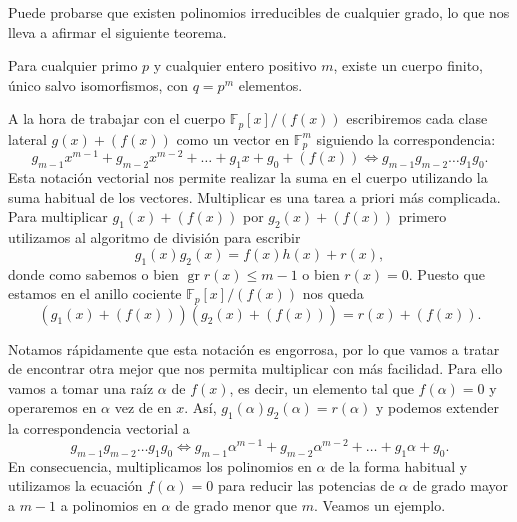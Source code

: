 Puede probarse que existen polinomios irreducibles de cualquier grado, lo que nos lleva a afirmar el siguiente teorema.

\begin{theorem}
  Para cualquier primo \(p\) y cualquier entero positivo \(m\), existe un cuerpo finito, único salvo isomorfismos, con \(q = p^m\) elementos.
\end{theorem}

A la hora de trabajar con el cuerpo \(\mathbb F_p[x]/(f(x))\) escribiremos cada clase lateral \(g(x) + (f(x))\) como un vector en \(\mathbb F_p^m\) siguiendo la correspondencia:
\[
  g_{m-1}x^{m-1} + g_{m-2}x^{m-2}+ \dots + g_1x + g_0 + (f(x)) \iff g_{m-1}g_{m-2}\dots g_1g_0.
\]
Esta notación vectorial nos permite realizar la suma en el cuerpo utilizando la suma habitual de los vectores.
Multiplicar es una tarea a priori más complicada.
Para multiplicar \(g_1(x) + (f(x))\) por \(g_2(x) + (f(x))\) primero utilizamos al algoritmo de división para escribir
\[
  g_1(x)g_2(x) = f(x)h(x) + r(x),
\]
donde como sabemos o bien \(\operatorname{gr} r(x) \leq m -1\) o bien \(r(x) = 0\).
Puesto que estamos en el anillo cociente \(\mathbb F_p[x]/(f(x))\) nos queda
\[
  (g_1(x) + (f(x)))(g_2(x) + (f(x))) = r(x) + (f(x)).
\]

Notamos rápidamente que esta notación es engorrosa, por lo que vamos a tratar de encontrar otra mejor que nos permita multiplicar con más facilidad.
Para ello vamos a tomar una raíz \(\alpha\) de \(f(x)\), es decir, un elemento tal que \(f(\alpha) = 0\) y operaremos en \(\alpha\) vez de en \(x\).
Así, \(g_1(\alpha)g_2(\alpha) = r(\alpha)\) y podemos extender la correspondencia vectorial a
\[
  g_{m-1}g_{m-2}\dots g_1g_0 \iff g_{m-1}\alpha^{m-1} + g_{m-2}\alpha^{m-2}+ \dots + g_1\alpha + g_0.
\]
En consecuencia, multiplicamos los polinomios en \(\alpha\) de la forma habitual y utilizamos la ecuación \(f(\alpha) = 0\) para reducir las potencias de \(\alpha\) de grado mayor a \(m-1\) a polinomios en \(\alpha\) de grado menor que \(m\).
Veamos un ejemplo.

